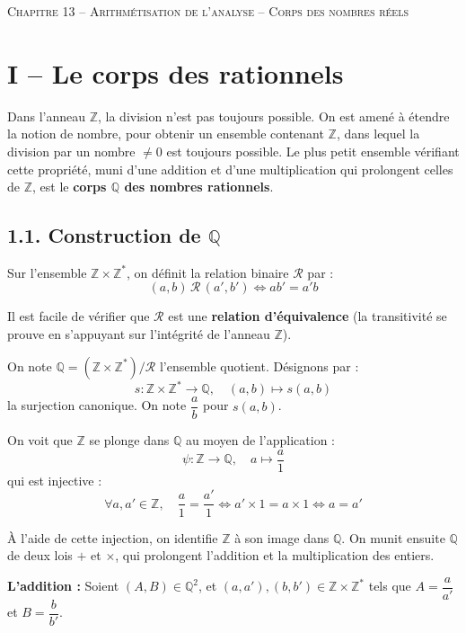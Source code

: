 \documentclass[a4paper,11pt]{article}
\newcommand{\Z}{\mathbb{Z}}
\newcommand{\Q}{\mathbb{Q}}
\newcommand{\mot}[1]{\textcolor{bordeaux}{\textbf{#1}}}
\begin{document}
\begin{center}
  {\Huge \scshape \color{bordeaux} Chapitre 13 -- Arithmétisation de l'analyse -- Corps des nombres réels}
\end{center}
\vspace{10pt}

\section{I -- Le corps des rationnels}

Dans l'anneau $\Z$, la division n'est pas toujours possible. On est amené à étendre la notion de nombre, pour obtenir un ensemble contenant $\Z$, dans lequel la division par un nombre $\neq 0$ est toujours possible. Le plus petit ensemble vérifiant cette propriété, muni d'une addition et d'une multiplication qui prolongent celles de $\Z$, est le \mot{corps $\Q$ des nombres rationnels}.

\subsection{1.1. Construction de $\Q$}

Sur l'ensemble $\Z \times \Z^*$, on définit la relation binaire $\mathcal{R}$ par :
\[
(a, b) \, \mathcal{R} \, (a', b') \iff a b' = a' b
\]

Il est facile de vérifier que $\mathcal{R}$ est une \mot{relation d'équivalence} (la transitivité se prouve en s'appuyant sur l'intégrité de l'anneau $\Z$).

On note $\Q = (\Z \times \Z^*) / \mathcal{R}$ l'ensemble quotient. Désignons par :
\[
s : \Z \times \Z^* \longrightarrow \Q, \quad (a, b) \longmapsto s(a, b)
\]
la surjection canonique. On note $\dfrac{a}{b}$ pour $s(a, b)$.

On voit que $\Z$ se plonge dans $\Q$ au moyen de l'application :
\[
\psi : \Z \longrightarrow \Q, \quad a \longmapsto \frac{a}{1}
\]
qui est injective :
\[
\forall a, a' \in \Z, \quad \frac{a}{1} = \frac{a'}{1} \iff a' \times 1 = a \times 1 \iff a = a'
\]

À l'aide de cette injection, on identifie $\Z$ à son image dans $\Q$. On munit ensuite $\Q$ de deux lois $+$ et $\times$, qui prolongent l'addition et la multiplication des entiers.

\textbf{L'addition :} Soient $(A, B) \in \Q^2$, et $(a, a'), (b, b') \in \Z \times \Z^*$ tels que $A = \dfrac{a}{a'}$ et $B = \dfrac{b}{b'}$.
\end{document}
